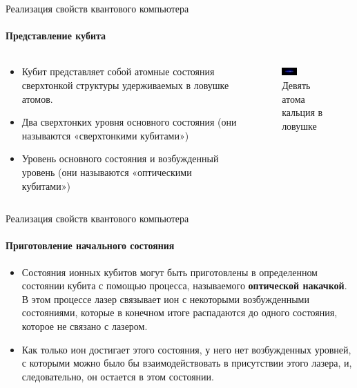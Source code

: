 \documentclass{beamer}
\begin{document}
    \begin{frame}{Реализация свойств квантового компьютера}
    \framesubtitle{Представление кубита}

        \begin{columns}

        \begin{column}{0.6\textwidth}

            \begin{itemize}
                \item <1-> Кубит представляет собой атомные состояния сверхтонкой структуры удерживаемых в ловушке атомов. 
                \item <2-> Два сверхтонких уровня основного состояния (они называются «сверхтонкими кубитами»)
                \item <3-> Уровень основного состояния и возбужденный уровень (они называются «оптическими кубитами»)
            \end{itemize}

        \end{column}

        \begin{column}{0.4\textwidth}
            \begin{figure}
                \centering
                \includegraphics[width=0.35\textwidth]{media/nine-calcium-ions.jpg}
                \caption{Девять атома кальция в ловушке}
            \end{figure}
        \end{column}

        \end{columns}
    \end{frame}

    \begin{frame}{Реализация свойств квантового компьютера}
    \framesubtitle{Приготовление начального состояния}

    \begin{itemize}
            \item <1-> Состояния ионных кубитов могут быть приготовлены в определенном состоянии кубита с помощью процесса, называемого \textbf{оптической накачкой}. В этом процессе лазер связывает ион с некоторыми возбужденными состояниями, которые в конечном итоге распадаются до одного состояния, которое не связано с лазером.
            \item <2-> Как только ион достигает этого состояния, у него нет возбужденных уровней, с которыми можно было бы взаимодействовать в присутствии этого лазера, и, следовательно, он остается в этом состоянии.
    \end{itemize}


    \end{frame}
\end{document}
